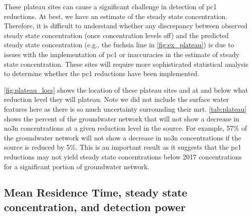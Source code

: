 
These plateau sites can cause a significant challenge in detection of \gls{pc1} reductions. At best, we have an estimate of the steady state concentration. Therefore, it is difficult to understand whether any discrepancy between observed steady state concentration (once concentration levels off) and the predicted steady state concentration (e.g., the fuchsia line in \autoref{fig:ex_plateau}) is due to issues with the implementation of \gls{pc1} or inaccuracies in the estimate of steady state concentration. These sites will require more sophisticated statistical analysis to determine whether the \gls{pc1} reductions have been implemented.



\autoref{fig:plateau_locs} shows the location of these plateau sites and at and below what reduction level they will plateau. Note we did not include the surface water features here as there is so much uncertainty surrounding their \gls{mrt}.  \autoref{tab:plateau} shows the percent of the groundwater network that will not show a decrease in \gls{no3n} concentrations at a given reduction level in the source. For example, 57\% of the groundwater network will not show a decrease in \gls{no3n} concentrations if the source is reduced by 5\%. This is an important result as it suggests that the \gls{pc1} reductions may not yield steady state concentrations below 2017 concentrations for a significant portion of groundwater network.

\begin{landscape}
\end{landscape}

\subsection[Mean Residence Time Impacts]{Mean Residence Time, steady state concentration, and detection power} \label{sec:mrt_results}

